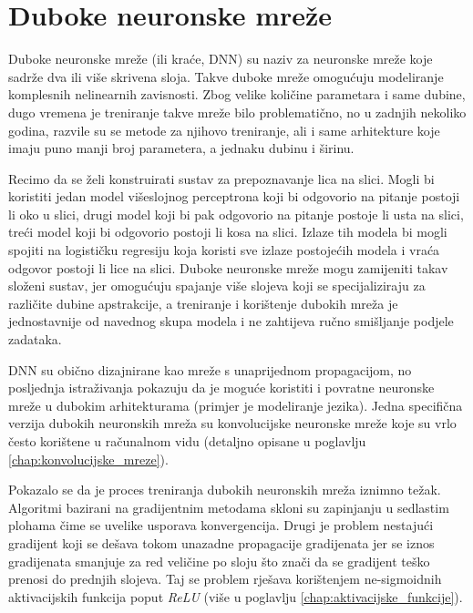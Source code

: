 \documentclass[times, utf8, diplomski, numeric]{fer}
\begin{document}
\section{Duboke neuronske mreže}

Duboke neuronske mreže (ili kraće, DNN) su naziv za neuronske mreže koje sadrže dva ili više skrivena sloja. Takve duboke mreže omogućuju modeliranje komplesnih nelinearnih zavisnosti. Zbog velike količine parametara i same dubine, dugo vremena je treniranje takve mreže bilo problematično, no u zadnjih nekoliko godina, razvile su se metode za njihovo treniranje, ali i same arhitekture koje imaju puno manji broj parametera, a jednaku dubinu i širinu.

Recimo da se želi konstruirati sustav za prepoznavanje lica na slici. Mogli bi koristiti jedan model višeslojnog perceptrona koji bi odgovorio na pitanje postoji li oko u slici, drugi model koji bi pak odgovorio na pitanje postoje li usta na slici, treći model koji bi odgovorio postoji li kosa na slici. Izlaze tih modela bi mogli spojiti na logističku regresiju koja koristi sve izlaze postojećih modela i vraća odgovor postoji li lice na slici. Duboke neuronske mreže mogu zamijeniti takav složeni sustav, jer omogućuju spajanje više slojeva koji se specijaliziraju za različite dubine apstrakcije, a treniranje i korištenje dubokih mreža je jednostavnije od navednog skupa modela i ne zahtijeva ručno smišljanje podjele zadataka.

DNN su obično dizajnirane kao mreže s unaprijednom propagacijom, no posljednja istraživanja pokazuju da je moguće koristiti i povratne neuronske mreže   u dubokim arhitekturama (primjer je modeliranje jezika). Jedna specifična verzija dubokih neuronskih mreža su konvolucijske neuronske mreže koje su vrlo često korištene u računalnom vidu (detaljno opisane u poglavlju \ref{chap:konvolucijske_mreze}).

Pokazalo se da je proces treniranja dubokih neuronskih mreža iznimno težak. Algoritmi bazirani na gradijentnim metodama skloni su zapinjanju u sedlastim plohama čime se uvelike usporava konvergencija. Drugi je problem nestajući gradijent  koji se dešava tokom unazadne propagacije gradijenata jer se iznos gradijenata smanjuje za red veličine po sloju što znači da se gradijent teško prenosi do prednjih slojeva. Taj se problem rješava korištenjem ne-sigmoidnih aktivacijskih funkcija poput \textit{ReLU} (više u poglavlju \ref{chap:aktivacijske_funkcije}).
\end{document}
